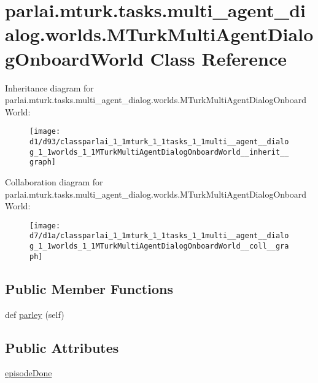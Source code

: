\hypertarget{classparlai_1_1mturk_1_1tasks_1_1multi__agent__dialog_1_1worlds_1_1MTurkMultiAgentDialogOnboardWorld}{}\section{parlai.\+mturk.\+tasks.\+multi\+\_\+agent\+\_\+dialog.\+worlds.\+M\+Turk\+Multi\+Agent\+Dialog\+Onboard\+World Class Reference}
\label{classparlai_1_1mturk_1_1tasks_1_1multi__agent__dialog_1_1worlds_1_1MTurkMultiAgentDialogOnboardWorld}


Inheritance diagram for parlai.\+mturk.\+tasks.\+multi\+\_\+agent\+\_\+dialog.\+worlds.\+M\+Turk\+Multi\+Agent\+Dialog\+Onboard\+World\+:
\nopagebreak
\begin{figure}[H]
\begin{center}
\leavevmode
\texttt{[image: d1/d93/classparlai\_1\_1mturk\_1\_1tasks\_1\_1multi\_\_agent\_\_dialog\_1\_1worlds\_1\_1MTurkMultiAgentDialogOnboardWorld\_\_inherit\_\_graph]}
\end{center}
\end{figure}


Collaboration diagram for parlai.\+mturk.\+tasks.\+multi\+\_\+agent\+\_\+dialog.\+worlds.\+M\+Turk\+Multi\+Agent\+Dialog\+Onboard\+World\+:
\nopagebreak
\begin{figure}[H]
\begin{center}
\leavevmode
\texttt{[image: d7/d1a/classparlai\_1\_1mturk\_1\_1tasks\_1\_1multi\_\_agent\_\_dialog\_1\_1worlds\_1\_1MTurkMultiAgentDialogOnboardWorld\_\_coll\_\_graph]}
\end{center}
\end{figure}
\subsection*{Public Member Functions}
\begin{DoxyCompactItemize}
\item 
def \hyperlink{classparlai_1_1mturk_1_1tasks_1_1multi__agent__dialog_1_1worlds_1_1MTurkMultiAgentDialogOnboardWorld_a7d4faad98ebcfd2479530e0f10e1d7ca}{parley} (self)
\end{DoxyCompactItemize}
\subsection*{Public Attributes}
\begin{DoxyCompactItemize}
\item 
\hyperlink{classparlai_1_1mturk_1_1tasks_1_1multi__agent__dialog_1_1worlds_1_1MTurkMultiAgentDialogOnboardWorld_ab64b208abf89723fe28967e054f4802e}{episode\+Done}
\end{DoxyCompactItemize}


